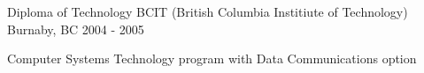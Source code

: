 \begin{cventries}
  \cventry
    {Diploma of Technology}
    {BCIT (British Columbia Institiute of Technology)}
    {Burnaby, BC}
    {2004 - 2005}
    {
      \begin{cvitems}
        \item {Computer Systems Technology program with Data Communications option}
      \end{cvitems}
    }
\end{cventries}
